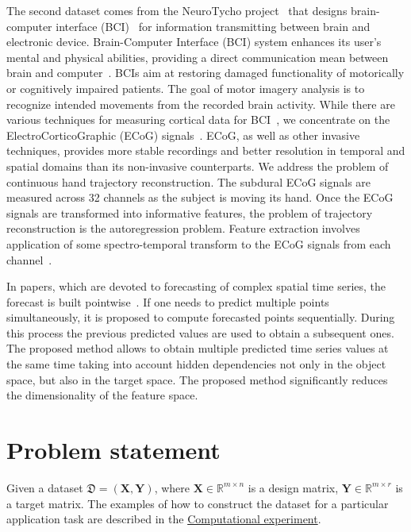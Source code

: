 \documentclass[12pt,twoside]{article}
\begin{document}
The second dataset comes from the NeuroTycho project~\cite{neurotycho} that designs brain-computer interface (BCI)~\cite{millan2010combining,mason2007comprehensive} for information transmitting between brain and electronic device.
Brain-Computer Interface (BCI) system enhances its user’s mental and physical abilities, providing a direct communication mean between brain and computer~\cite{millan2004brain}. 
BCIs aim at restoring damaged functionality of motorically or cognitively impaired patients.
The goal of motor imagery analysis is to recognize intended movements from the recorded brain activity. 
While there are various techniques for measuring cortical data for BCI~\cite{nicolas2012brain,amiri2013review}, we concentrate on the ElectroCorticoGraphic (ECoG) signals~\cite{eliseyev2016penalized}. 
ECoG, as well as other invasive techniques, provides more stable recordings and better resolution in temporal and spatial domains than its non-invasive counterparts.
We address the problem of continuous hand trajectory reconstruction. 
The subdural ECoG signals are measured across 32 channels as the subject is moving its hand.
Once the ECoG signals are transformed into informative features, the problem of trajectory reconstruction is the autoregression problem. 
Feature extraction involves application of some spectro-temporal transform to the ECoG signals from each channel~\cite{gasanov2017pls}.

In papers, which are devoted to forecasting of complex spatial time series, the forecast is built pointwise~\cite{box2015time,zhang2003time}.
If one needs to predict multiple points simultaneously, it is proposed to compute forecasted points sequentially.
During this process the previous predicted values are used to obtain a subsequent ones.
The proposed method allows to obtain multiple predicted time series values at the same time taking into account hidden dependencies not only in the object space, but also in the target space.
The proposed method significantly reduces the dimensionality of the feature space.
 

\section{Problem statement}

Given a dataset $\mathfrak{D}= \left( \mathbf{X}, \mathbf{Y} \right)$, where $\mathbf{X} \in \mathbb{R}^{m \times n}$ is a design matrix, $\mathbf{Y} \in \mathbb{R}^{m \times r}$ is a target matrix. 
The examples of how to construct the dataset for a particular application task are described in the \hyperref[sec:exper]{Computational experiment}.
\end{document}
